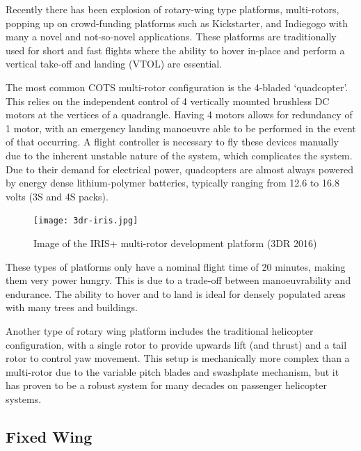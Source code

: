 Recently there has been explosion of rotary-wing type platforms, multi-rotors, popping up on crowd-funding platforms such as Kickstarter, and Indiegogo with many a novel and not-so-novel applications. These platforms are traditionally used for short and fast flights where the ability to hover in-place and perform a vertical take-off and landing (VTOL) are essential.

The most common COTS multi-rotor configuration is the 4-bladed ‘quadcopter’. This relies on the independent control of 4 vertically mounted brushless DC motors at the vertices of a quadrangle. Having 4 motors allows for redundancy of 1 motor, with an emergency landing manoeuvre able to be performed in the event of that occurring. A flight controller is necessary to fly these devices manually due to the inherent unstable nature of the system, which complicates the system. Due to their demand for electrical power, quadcopters are almost always powered by energy dense lithium-polymer batteries, typically ranging from 12.6 to 16.8 volts (3S and 4S packs).

\begin{figure}
    \centering
    \texttt{[image: 3dr-iris.jpg]}
    \caption{Image of the IRIS+ multi-rotor development platform (3DR 2016)}
    \label{fig:3dr-iris}
\end{figure}

These types of platforms only have a nominal flight time of 20 minutes, making them very power hungry. This is due to a trade-off between manoeuvrability and endurance. The ability to hover and to land is ideal for densely populated areas with many trees and buildings.

Another type of rotary wing platform includes the traditional helicopter configuration, with a single rotor to provide upwards lift (and thrust) and a tail rotor to control yaw movement. This setup is mechanically more complex than a multi-rotor due to the variable pitch blades and swashplate mechanism, but it has proven to be a robust system for many decades on passenger helicopter systems.


\subsection{Fixed Wing}

